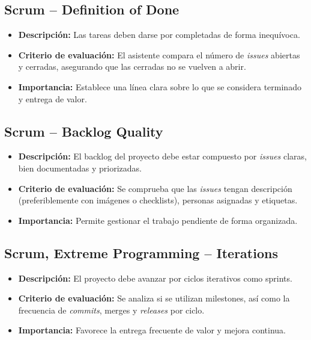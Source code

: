 \subsection{Scrum – Definition of Done}

\begin{itemize}
  \item \textbf{Descripción:} Las tareas deben darse por completadas de forma inequívoca.
  \item \textbf{Criterio de evaluación:} El asistente compara el número de \textit{issues} abiertas y cerradas, asegurando que las cerradas no se vuelven a abrir.
  \item \textbf{Importancia:} Establece una línea clara sobre lo que se considera terminado y entrega de valor.
\end{itemize}

\subsection{Scrum – Backlog Quality}

\begin{itemize}
  \item \textbf{Descripción:} El backlog del proyecto debe estar compuesto por \textit{issues} claras, bien documentadas y priorizadas.
  \item \textbf{Criterio de evaluación:} Se comprueba que las \textit{issues} tengan descripción (preferiblemente con imágenes o checklists), personas asignadas y etiquetas.
  \item \textbf{Importancia:} Permite gestionar el trabajo pendiente de forma organizada.
\end{itemize}

\subsection{Scrum, Extreme Programming – Iterations}

\begin{itemize}
  \item \textbf{Descripción:} El proyecto debe avanzar por ciclos iterativos como sprints.
  \item \textbf{Criterio de evaluación:} Se analiza si se utilizan milestones, así como la frecuencia de \textit{commits}, merges y \textit{releases} por ciclo.
  \item \textbf{Importancia:} Favorece la entrega frecuente de valor y mejora continua.
\end{itemize}


